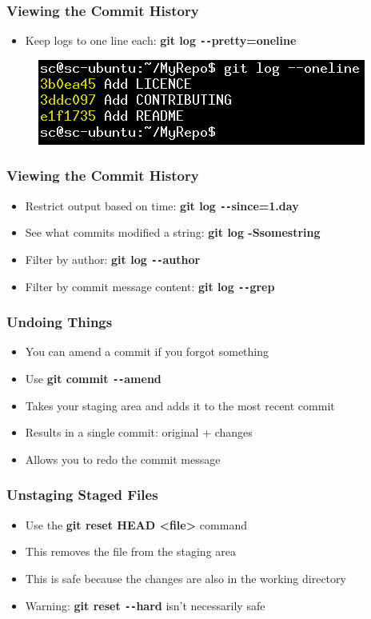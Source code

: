 \documentclass{beamer}
\begin{document}
\begin{frame}
	\frametitle{Viewing the Commit History}
	\begin{itemize}
		\item{Keep logs to one line each: \textbf{git log \texttt{-{}-}pretty=oneline}}
	\end{itemize}
	\begin{figure}
		\includegraphics[scale=0.6]{Viewing_the_Commit_History-2.png}
	\end{figure}
\end{frame}

\begin{frame}
	\frametitle{Viewing the Commit History}
	\begin{itemize}
		\item{Restrict output based on time: \textbf{git log \texttt{-{}-}since=1.day}}
		\item{See what commits modified a string: \textbf{git log -Ssomestring}}
		\item{Filter by author: \textbf{git log \texttt{-{}-}author}}
		\item{Filter by commit message content: \textbf{git log \texttt{-{}-}grep}}
	\end{itemize}
\end{frame}

\begin{frame}
	\frametitle{Undoing Things}
	\begin{itemize}
		\item{You can amend a commit if you forgot something}
		\item{Use \textbf{git commit \texttt{-{}-}amend}}
		\item{Takes your staging area and adds it to the most recent commit}
		\item{Results in a single commit: original + changes}
		\item{Allows you to redo the commit message}
	\end{itemize}
\end{frame}

\begin{frame}
	\frametitle{Unstaging Staged Files}
	\begin{itemize}
		\item{Use the \textbf{git reset HEAD \textless{}file\textgreater{}} command}
		\item{This removes the file from the staging area}
		\item{This is safe because the changes are also in the working directory}
		\item{Warning: \textbf{git reset \texttt{-{}-}hard} isn't necessarily safe}
	\end{itemize}
\end{frame}
\end{document}
